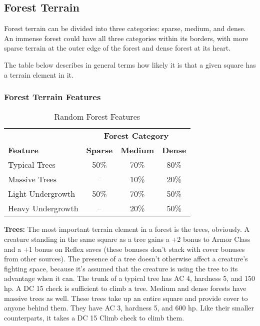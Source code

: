 \subsection{Forest Terrain}

Forest terrain can be divided into three categories: sparse, medium, and dense. 
An immense forest could have all three categories within its borders, with more 
sparse terrain at the outer edge of the forest and dense forest at its heart. 

The table below describes in general terms how likely it is that a given square 
has a terrain element in it.

\subsubsection{Forest Terrain Features}

\begin{table}[htb]
\caption{Random Forest Features}
\centering
\begin{tabular}{l c c c}
 & \multicolumn{3}{c}{\textbf{Forest Category}}\\
\textbf{Feature} & \textbf{Sparse} & \textbf{Medium} & \textbf{Dense}\\
Typical Trees & 50\% & 70\% & 80\%\\
Massive Trees & -- & 10\% & 20\%\\
Light Undergrowth & 50\% & 70\% & 50\%\\
Heavy Undergrowth& -- & 20\% & 50\%\\
\end{tabular}
\end{table}

\textbf{Trees:} The most important terrain element in a forest is the trees, obviously. 
A creature standing in the same square as a tree gains a +2 bonus to Armor Class 
and a +1 bonus on Reflex saves (these bonuses don't stack with cover bonuses from 
other sources). The presence of a tree doesn't otherwise affect a creature's fighting 
space, because it's assumed that the creature is using the tree to its advantage 
when it can. The trunk of a typical tree has AC 4, hardness 5, and 150 hp. A DC 
15  check is sufficient to climb a tree. Medium and dense forests have massive 
trees as well. These trees take up an entire square and provide cover to anyone 
behind them. They have AC 3, hardness 5, and 600 hp. Like their smaller counterparts, 
it takes a DC 15 Climb check to climb them.

